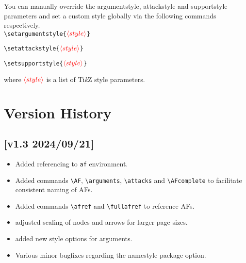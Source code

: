 \documentclass[headings=normal]{scrartcl}
\newcommand{\tikzname}{Ti\emph{k}Z\xspace}
\newcommand{\opt}[2][red]{\ensuremath{\textcolor{#1}{\langle #2\rangle}}}
\begin{document}
    You can manually override the \textsf{argumentstyle}, \textsf{attackstyle} and \textsf{supportstyle} parameters and set a custom style globally via the following commands respectively.\\

    \vspace{-0.3cm}
    \noindent
    \verb|\setargumentstyle{|\opt{style}\verb|}|
    
    \noindent
    \verb|\setattackstyle{|\opt{style}\verb|}|
    
    \noindent
    \verb|\setsupportstyle{|\opt{style}\verb|}|
    
    \begin{list}{}{\leftmargin=\parindent\rightmargin=0pt}
        \item
        where \opt{style} is a list of \tikzname style parameters.
    \end{list}


\newpage
\section{Version History}\label{sec:history}
\subsection*{[v1.3 2024/09/21]}
\begin{itemize}
    \item Added referencing to \texttt{af} environment.
    \item Added commands \verb|\AF|, \verb|\arguments|, \verb|\attacks| and \verb|\AFcomplete| to facilitate consistent naming of AFs.
    \item Added commands \verb|\afref| and \verb|\fullafref| to reference AFs.
    \item adjusted scaling of nodes and arrows for larger page sizes.
    \item added new style options for arguments.
    \item Various minor bugfixes regarding the \textsf{namestyle} package option.
\end{itemize}
\end{document}

